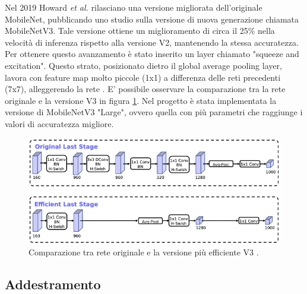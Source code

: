 \documentclass[11pt]{report}
\begin{document}
Nel 2019 Howard \textit{et al.} \cite{howard2019searching} rilasciano una versione migliorata dell'originale MobileNet, pubblicando uno studio sulla versione di nuova generazione chiamata MobileNetV3. Tale versione ottiene un miglioramento di circa il 25\% nella velocità di inferenza rispetto alla versione V2, mantenendo la stessa accuratezza. Per ottenere questo avanzamento è stato inserito un layer chiamato "squeeze and excitation". Questo strato, posizionato dietro il global average pooling layer, lavora con feature map molto piccole (1x1) a differenza delle reti precedenti (7x7), alleggerendo la rete \cite{hollemans}. E' possibile osservare la comparazione tra la rete originale e la versione V3 in figura \ref{fig:mobv3}. Nel progetto è stata implementata la versione di MobileNetV3 "Large", ovvero quella con più parametri che raggiunge i valori di accuratezza migliore. 

\begin{figure}
    \centering
    \includegraphics[scale=1]{img/MobileNetV3FinalStage.png}
    \caption{Comparazione tra rete originale e la versione più efficiente V3 \cite{howard2019searching}\cite{hollemans}.}
    \label{fig:mobv3}
\end{figure}

\newpage

\subsection{Addestramento}
\end{document}
